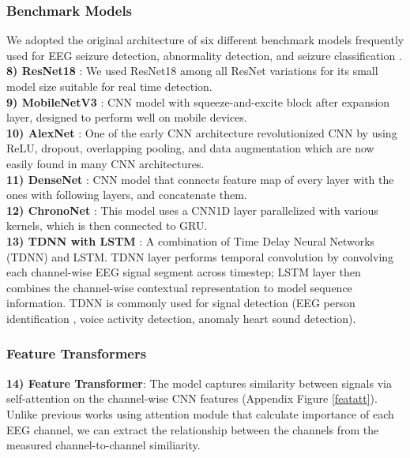 \documentclass[pmlr,twocolumn,10pt]{jmlr}
\begin{document}
\subsubsection{Benchmark Models}
We adopted the original architecture of six different benchmark models frequently used for EEG seizure detection, abnormality detection, and seizure classification \citep{jia2022variable, ahmedt2020neural, seizuretype2020tuh, priyasad2021interpretable, asif2020seizurenet, sriraam2019convolutional, roy2019chrononet, thyagachandran2020seizure}.\\ 
\textbf{8) ResNet18} \citep{he2016deep}: We used ResNet18 among all ResNet variations for its small model size suitable for real time detection. \\
\textbf{9) MobileNetV3} \citep{howard2019searching}: CNN model with squeeze-and-excite block after expansion layer, designed to perform well on mobile devices. \\
\textbf{10) AlexNet} \citep{krizhevsky2012imagenet}: One of the early CNN architecture revolutionized CNN by using ReLU, dropout, overlapping pooling, and data augmentation which are now easily found in many CNN architectures. \\
\textbf{11) DenseNet} \citep{huang2017densely}: CNN model that connects feature map of every layer with the ones with following layers, and concatenate them.\\
\textbf{12) ChronoNet} \citep{roy2019chrononet}: This model uses a CNN1D layer parallelized with various kernels, which is then connected to GRU.\\
\noindent\textbf{13) TDNN with LSTM} \citep{thyagachandran2020seizure}: A combination of Time Delay Neural Networks (TDNN) and LSTM. TDNN layer performs temporal convolution by convolving each channel-wise EEG signal segment across timestep; LSTM layer then combines the channel-wise contextual representation to model sequence information. TDNN is commonly used for signal detection (EEG person identification \citep{kumar2019subspace}, voice activity detection, anomaly heart sound detection).

\subsubsection{Feature Transformers}
\noindent\textbf{14) Feature Transformer}: The model captures similarity between signals via self-attention on the channel-wise CNN features (Appendix Figure \ref{featatt}). Unlike previous works using attention module \citep{priyasad2021interpretable, yuan2018novel, yuan2018multi} that calculate importance of each EEG channel, we can extract the relationship between the channels from the measured channel-to-channel similiarity.
\end{document}
